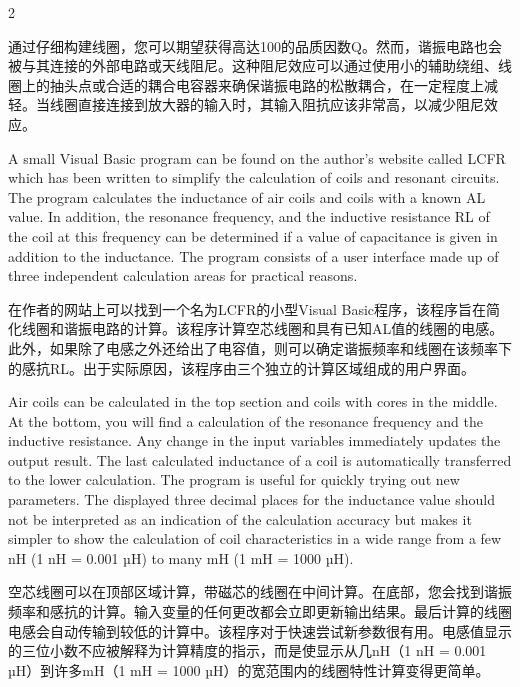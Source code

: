 \documentclass{ctexbook}
\begin{document}
\begin{paracol}{2}
\switchcolumn

通过仔细构建线圈，您可以期望获得高达100的品质因数Q。然而，谐振电路也会被与其连接的外部电路或天线阻尼。这种阻尼效应可以通过使用小的辅助绕组、线圈上的抽头点或合适的耦合电容器来确保谐振电路的松散耦合，在一定程度上减轻。当线圈直接连接到放大器的输入时，其输入阻抗应该非常高，以减少阻尼效应。

\switchcolumn*

A small Visual Basic program can be found on the author's website called LCFR which has 
been written to simplify the calculation of coils and resonant circuits. The program calculates the inductance of air coils and coils with a known AL value. In addition, the resonance 
frequency, and the inductive resistance RL of the coil at this frequency can be determined if 
a value of capacitance is given in addition to the inductance. The program consists of a user 
interface made up of three independent calculation areas for practical reasons.

\switchcolumn

在作者的网站上可以找到一个名为LCFR的小型Visual Basic程序，该程序旨在简化线圈和谐振电路的计算。该程序计算空芯线圈和具有已知AL值的线圈的电感。此外，如果除了电感之外还给出了电容值，则可以确定谐振频率和线圈在该频率下的感抗RL。出于实际原因，该程序由三个独立的计算区域组成的用户界面。

\switchcolumn*

Air coils can 
be calculated in the top section and coils with cores in the middle. At the bottom, you will 
find a calculation of the resonance frequency and the inductive resistance. Any change in 
the input variables immediately updates the output result. The last calculated inductance 
of a coil is automatically transferred to the lower calculation. The program is useful for 
quickly trying out new parameters. The displayed three decimal places for the inductance 
value should not be interpreted as an indication of the calculation accuracy but makes it 
simpler to show the calculation of coil characteristics in a wide range from a few nH (1 nH 
= 0.001 µH) to many mH (1 mH = 1000 µH). 

\switchcolumn

空芯线圈可以在顶部区域计算，带磁芯的线圈在中间计算。在底部，您会找到谐振频率和感抗的计算。输入变量的任何更改都会立即更新输出结果。最后计算的线圈电感会自动传输到较低的计算中。该程序对于快速尝试新参数很有用。电感值显示的三位小数不应被解释为计算精度的指示，而是使显示从几nH（1 nH = 0.001 µH）到许多mH（1 mH = 1000 µH）的宽范围内的线圈特性计算变得更简单。


\end{paracol}
\end{document}

